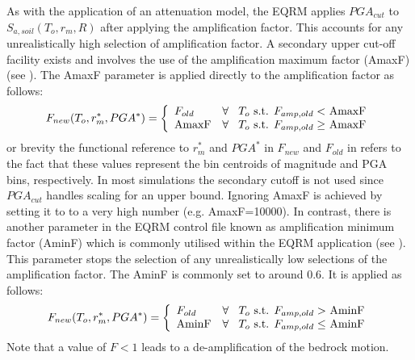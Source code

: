 As with the application of an attenuation model, the EQRM applies
$PGA_{cut}$ to $S_{a,soil}(T_o,r_m,R)$ after applying the
amplification factor. This accounts for any unrealistically high
selection of amplification factor. A secondary upper cut-off
facility exists and involves the use of the amplification maximum
factor (AmaxF) (see ). The AmaxF
parameter is applied directly to the amplification factor as
follows:
\begin{equation}
\label{eq:regolith-maxampfactor}
F_{new}(T_o,r_m^*,PGA^*) = \left \{ \begin{array}{ll} F_{old} & \textrm{$\forall$ \hspace{0.2em} $T_o$ s.t. $F_{amp,old}< $ AmaxF} \\
\textrm{AmaxF} & \textrm{$\forall$ \hspace{0.2em} $T_o$ s.t. $F_{amp,old} \geq $ AmaxF} \\
\end{array} \right.
\end{equation}
or brevity the functional reference to $r_m^*$ and $PGA^*$ in
$F_{new}$ and $F_{old}$ in
 refers
to the fact that these values represent the bin centroids of
magnitude and PGA bins, respectively. In most simulations the
secondary cutoff is not used since $PGA_{cut}$ handles scaling for
an upper bound. Ignoring AmaxF is achieved by setting it to to a
very high number (e.g. AmaxF=10000). In contrast, there is another
parameter in the EQRM control file known as amplification minimum
factor (AminF) which is commonly utilised within the EQRM
application (see ). This parameter
stops the selection of any unrealistically low selections of the
amplification factor. The AminF is commonly set to around 0.6. It is
applied as follows:
\begin{equation}
\label{eq:regolith-minampfactor}
F_{new}(T_o,r_m^*,PGA^*) = \left \{ \begin{array}{ll} F_{old} & \textrm{$\forall$ \hspace{0.2em} $T_o$ s.t. $F_{amp,old} > $ AminF} \\
\textrm{AminF} & \textrm{$\forall$ \hspace{0.2em} $T_o$ s.t. $F_{amp,old} \leq $ AminF} \\
\end{array} \right.
\end{equation}
Note that a value of \mbox{$F<1$} leads to a de-amplification of
the bedrock motion.
